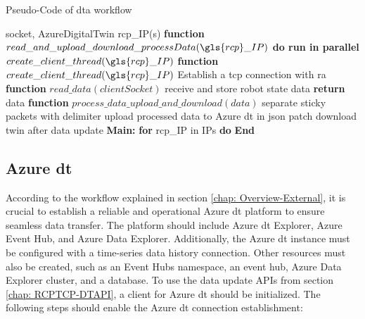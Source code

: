\begin{breakablealgorithm}
    \caption{Pseudo-Code of \gls{dta} workflow}
    \label{alg:DTAgentPseudoCode}
    \begin{algorithmic}
     socket, AzureDigitalTwin
     \gls{rcp}\_IP(s)
    \State \textbf{function} {$read\_and\_upload\_download\_processData(\gls{rcp}\_IP)$}
        \State \qquad \textbf{do run in parallel}
            \State \qquad \qquad $create\_client\_thread(\gls{rcp}\_IP)$       
    \State \textbf{function} {$create\_client\_thread(\gls{rcp}\_IP)$}
        \State \qquad Establish a \gls{tcp} connection with \gls{ra}
        \State {}  
        \State {}    
    \State \textbf{function} {$read\_data(clientSocket)$}
        \State \qquad receive and store robot state data
        \State \qquad \textbf{return} data
    \State \textbf{function} {$process\_data\_upload\_and\_download(data)$}
        \State \qquad separate sticky packets with delimiter
        \State \qquad upload processed data to Azure \gls{dt} in json patch
        \State \qquad download twin after data update 
    \State \textbf{Main:}
        \State \qquad \textbf{for} \gls{rcp}\_IP in IPs \textbf{do}
        \State \qquad {}
        \State \textbf{End}
    \end{algorithmic}
\end{breakablealgorithm}



\subsection{Azure \gls{dt}}
According to the workflow explained in section \ref{chap: Overview-External}, 
it is crucial to establish a reliable and operational Azure \gls{dt} platform 
to ensure seamless data transfer. The platform should include Azure \gls{dt} Explorer, 
Azure Event Hub, and Azure Data Explorer. Additionally, the Azure \gls{dt} 
instance must be configured with a time-series data history connection. Other resources 
must also be created, such as an Event Hubs namespace, an event hub, Azure Data Explorer 
cluster, and a database. To use the data update APIs 
from section \ref{chap: RCPTCP-DTAPI}, a client for Azure \gls{dt} should be 
initialized. The following steps should enable the Azure \gls{dt} connection 
establishment: 


